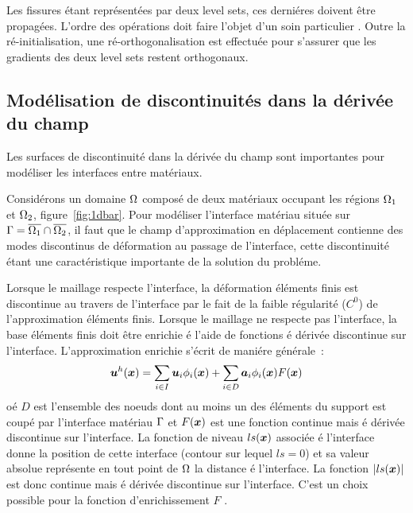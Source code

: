 Les fissures \'etant repr\'esent\'ees par deux level sets, ces derni\'eres
doivent \^etre propag\'ees. L'ordre des op\'erations doit faire l'objet
d'un soin particulier \cite{Moes3DGrowthII}. Outre la
r\'e-initialisation, une r\'e-orthogonalisation est effectu\'ee pour
s'assurer que les gradients des deux level sets restent orthogonaux.




\subsection{Mod\'elisation de discontinuit\'es dans la d\'eriv\'ee du champ}

Les surfaces de discontinuit\'e
dans la d\'eriv\'ee du champ sont importantes  pour mod\'eliser les interfaces entre mat\'eriaux.


Consid\'erons un domaine ${\Omega}$ compos\'e
de deux mat\'eriaux occupant les r\'egions
${\Omega}_1$ et ${\Omega}_2$, figure~\ref{fig:1dbar}.
Pour mod\'eliser l'interface
mat\'eriau situ\'ee sur
${\Gamma} = \overline{{\Omega}_1} \cap  \overline{{\Omega}_2}$,
il faut que le champ d'approximation en d\'eplacement
contienne des modes discontinus de d\'eformation
au passage de l'interface, cette discontinuit\'e
\'etant une caract\'eristique importante
de la solution du probl\'eme.





Lorsque le maillage respecte l'interface,
la d\'eformation \'el\'ements finis est discontinue au travers
de l'interface par le fait
de la faible r\'egularit\'e ($C^0$)
de l'approximation \'el\'ements finis.
Lorsque le maillage ne respecte pas l'interface,
la base \'el\'ements finis doit \^etre enrichie \'e l'aide de
fonctions \'e d\'eriv\'ee discontinue sur l'interface.
L'approximation enrichie s'\'ecrit
de mani\'ere g\'en\'erale~:
\begin{equation}
\mbox{\boldmath $u$}^h(\mbox{\boldmath $x$})  =  \sum_{i\in I} \mbox{\boldmath $u$}_i \phi_i(\mbox{\boldmath $x$}) +
\sum_{i\in D} \mbox{\boldmath $a$}_i \phi_i(\mbox{\boldmath $x$}) F(\mbox{\boldmath $x$})
\end{equation}
o\'e $D$ est l'ensemble des noeuds dont au moins un
des \'el\'ements du support
est coup\'e par l'interface mat\'eriau ${\Gamma}$ et
$F(\mbox{\boldmath $x$})$ est une fonction continue mais
\'e d\'eriv\'ee discontinue sur l'interface.
La fonction de niveau $ls(\mbox{\boldmath $x$})$ associ\'ee
\'e l'interface donne la position de cette
interface (contour sur lequel $ls = 0$) et
sa valeur absolue repr\'esente en tout point de ${\Omega}$
la distance \'e l'interface.
La fonction $|ls(\mbox{\boldmath $x$})|$ est donc continue
mais \'e d\'eriv\'ee discontinue sur l'interface.
C'est un choix possible pour la fonction d'enrichissement
$F$ \cite{Sukumar:inclusion}.


